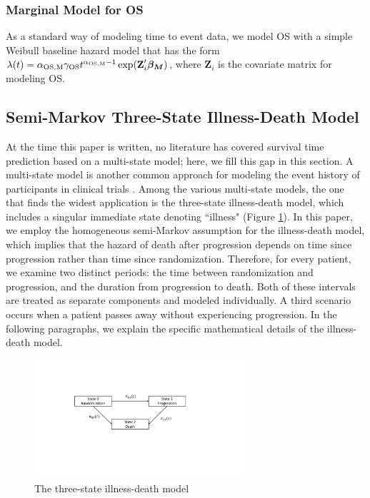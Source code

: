 \subsubsection{Marginal Model for OS} \label{sec:marginal}
As a standard way of modeling time to event data, we model \ac{OS} with a simple Weibull baseline hazard model that has the form
$\lambda(t)=\alpha_{\rm OS,M} \gamma_{\rm OS} t^{\alpha_{\rm OS,M}-1} \exp(\textbf{Z}_i' \boldsymbol{\beta_{M}})$,
where $\textbf{Z}_i$ is the covariate matrix for modeling OS.

\subsection{Semi-Markov Three-State Illness-Death Model}
\label{sec:multi-state}
At the time this paper is written, no literature has covered survival time prediction based on a multi-state model; here, we fill this gap in this section. A multi-state model is another common approach for modeling the event history of participants in clinical trials \citep{andersen2002multi, meira2009multi, putter2007tutorial}. Among the various multi-state models, the one that finds the widest application is the three-state illness-death model, which includes a singular immediate state denoting ``illness" (Figure \ref{fig:multistate}). In this paper, we employ the homogeneous semi-Markov assumption \citep{cox1977theory} for the illness-death model, which implies that the hazard of death after progression depends on time since progression rather than time since randomization. Therefore, for every patient, we examine two distinct periods: the time between randomization and progression, and the duration from progression to death. Both of these intervals are treated as separate components and modeled individually. A third scenario occurs when a patient passes away without experiencing progression. In the following paragraphs, we explain the specific mathematical details of the illness-death model.

\begin{figure}[H]
    \centering
    \includegraphics[width=0.7\textwidth]{chapters/figures/multi-state.pdf}
    \caption{The three-state illness-death model \label{fig:multistate}}
\end{figure}

